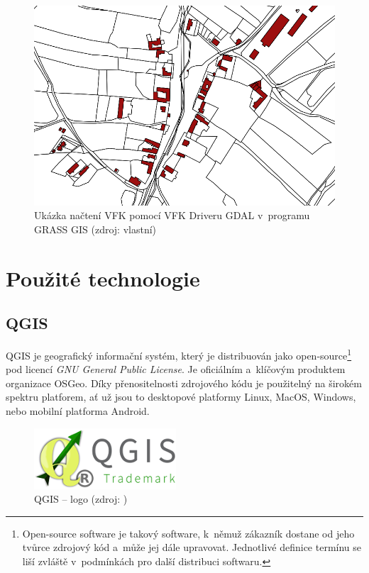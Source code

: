 \documentclass[a4paper,12pt,oneside]{book}
\begin{document}
\newpage

\begin{figure}[htbp]
\centering
\includegraphics[width=.7\textwidth]{images/grass_ukazka.png}
\caption[Ukázka načtení VFK pomocí VFK Driveru GDAL v~programu GRASS GIS]{Ukázka načtení VFK pomocí VFK Driveru GDAL v~programu GRASS GIS (zdroj: vlastní)}
\end{figure}



\clearpage
\chapter{Použité technologie}

\section{QGIS}

QGIS je geografický informační systém, který je distribuován jako
open-source\footnote{Open-source software je takový software, k~němuž
  zákazník dostane od jeho tvůrce zdrojový kód a~může jej dále
  upravovat. Jednotlivé definice termínu  se liší
  zvláště v~podmínkách pro další distribuci
  softwaru.\cite{abclinuxu_opensource}} pod licencí \textit{GNU
  General Public License}. Je oficiálním a~klíčovým produktem
organizace OSGeo. Díky přenositelnosti zdrojového kódu je použitelný
na širokém spektru platforem, ať už jsou to desktopové platformy
Linux, MacOS, Windows, nebo mobilní platforma Android.

\begin{figure}[htb]
\centering
\includegraphics[scale=1]{images/qgis-logo.png}
\caption[QGIS -- logo]{QGIS -- logo (zdroj: \cite{qgis})}
\end{figure}
\end{document}
